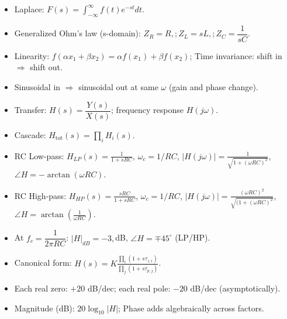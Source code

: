 \begin{tcolorbox}[colback=gray!10,colframe=black,title=Summary: Laplace & Impedances]
\begin{itemize}
\item Laplace: $F(s)=\int_{-\infty}^{\infty} f(t)e^{-st}dt$.
\item Generalized Ohm’s law (s-domain): $Z_R=R,; Z_L=sL,; Z_C=\dfrac{1}{sC}$.
\end{itemize}
\end{tcolorbox}

\begin{tcolorbox}[colback=gray!10,colframe=black,title=Summary: LTI & Transfer Functions]
\begin{itemize}
\item Linearity: $f(\alpha x_1+\beta x_2)=\alpha f(x_1)+\beta f(x_2)$; Time invariance: shift in $\Rightarrow$ shift out.
\item Sinusoidal in $\Rightarrow$ sinusoidal out at same $\omega$ (gain and phase change).
\item Transfer: $H(s)=\dfrac{Y(s)}{X(s)}$; frequency response $H(j\omega)$.
\item Cascade: $H_{\mathrm{tot}}(s)=\prod_i H_i(s)$.
\end{itemize}
\end{tcolorbox}

\begin{tcolorbox}[colback=gray!10,colframe=black,title=Summary: RC Filters (Key Forms)]
\begin{itemize}
\item RC Low-pass: $\displaystyle H_{LP}(s)=\frac{1}{1+sRC}$, $\omega_c=1/RC$, $|H(j\omega)|=\frac{1}{\sqrt{1+(\omega RC)^2}}$, $\angle H=-\arctan(\omega RC)$.
\item RC High-pass: $\displaystyle H_{HP}(s)=\frac{sRC}{1+sRC}$, $\omega_c = 1/RC$, $|H(j\omega)| = \frac{(\omega R C)^2}{\sqrt{(1 + (\omega R C )^2}}$, $\angle H = \arctan(\tfrac{1}{\omega RC})$.
\item At $f_c=\dfrac{1}{2\pi RC}$: $|H|_{dB}=-3,$dB, $\angle H=\mp 45^\circ$ (LP/HP).
\end{itemize}
\end{tcolorbox}

\begin{tcolorbox}[colback=gray!10,colframe=black,title=Summary: Bode Essentials]
\begin{itemize}
\item Canonical form: $\displaystyle H(s)=K\frac{\prod_i(1+s\tau_{z,i})}{\prod_j(1+s\tau_{p,j})}$.
\item Each real zero: $+20$ dB/dec; each real pole: $-20$ dB/dec (asymptotically).
\item Magnitude (dB): $20\log_{10}|H|$; Phase adds algebraically across factors.
\end{itemize}
\end{tcolorbox}

